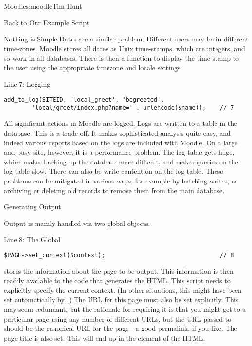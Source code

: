 \begin{aosachapter}{Moodle}{s:moodle}{Tim Hunt}
\begin{aosasect1}{Back to Our Example Script}
\begin{aosasect2}{Nothing is Simple}
Dates are a similar problem. Different users may be in different
time-zones. Moodle stores all dates as Unix time-stamps, which are
integers, and so work in all databases. There is then a 
function to display the time-stamp to the user using the appropriate
timezone and locale settings.

\end{aosasect2}

\begin{aosasect2}{Line 7: Logging}

\begin{verbatim}
add_to_log(SITEID, 'local_greet', 'begreeted',
        'local/greet/index.php?name=' . urlencode($name));    // 7
\end{verbatim}

All significant actions in Moodle are logged. Logs are written to a
table in the database. This is a trade-off. It makes sophisticated
analysis quite easy, and indeed various reports based on the logs are
included with Moodle. On a large and busy site, however, it is a
performance problem. The log table gets huge, which makes backing up
the database more difficult, and makes queries on the log table
slow. There can also be write contention on the log table. These
problems can be mitigated in various ways, for example by batching
writes, or archiving or deleting old records to remove them from the
main database.

\end{aosasect2}

\end{aosasect1}

\begin{aosasect1}{Generating Output}

Output is mainly handled via two global objects.

\begin{aosasect2}{Line 8: The  Global}

\begin{verbatim}
$PAGE->set_context($context);                                 // 8
\end{verbatim}

 stores the information about the page to be
output. This information is then readily available to the code that generates the
HTML. This script needs to explicitly specify the current
context. (In other situations, this might have been set automatically
by .) The URL for this
page must also be set explicitly. This may seem redundant, but the rationale for requiring it is that
you might get to a particular page using any number of different URLs,
but the URL passed to  should be the canonical URL for
the page---a good permalink, if you like. The page
title is also set. This will end up in the  element of the HTML.


\end{aosasect2}
\end{aosasect1}
\end{aosachapter}
